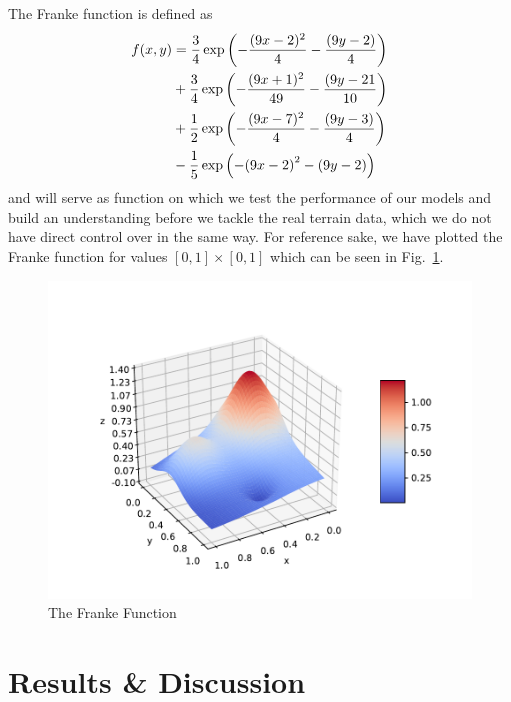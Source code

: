 \documentclass[reprint, english, nofootinbib]{revtex4-2}
\begin{document}
        The Franke function is defined as
        \begin{align}
        \label{eq:franke}
            \begin{split}
                f(x, y)
                &= \frac{3}{4}\exp\qty(-\frac{(9x - 2)^2}{4} - \frac{(9y - 2)}{4})      \\
                &+ \frac{3}{4}\exp\qty(-\frac{(9x + 1)^2}{49} - \frac{(9y - 21}{10})    \\
                &+ \frac{1}{2}\exp\qty(-\frac{(9x - 7)^2}{4} - \frac{(9y - 3)}{4})      \\
                &- \frac{1}{5}\exp\qty(-\qty(9x - 2)^2 - \qty(9y - 2))
            \end{split}
        \end{align}
        and will serve as function on which we test the performance of our models and build an understanding before we tackle the real terrain data, which we do not have direct control over in the same way. For reference sake, we have plotted the Franke function for values $[0, 1]\times[0,1]$ which can be seen in Fig.~\ref{fig:FrankeFunction}.
        \begin{figure}[h!tb]
            \center
            \includegraphics[width=\columnwidth]{frankefunc.pdf}
            \caption{\label{fig:FrankeFunction}The Franke Function}
        \end{figure}

\section{Results \& Discussion}
\end{document}
